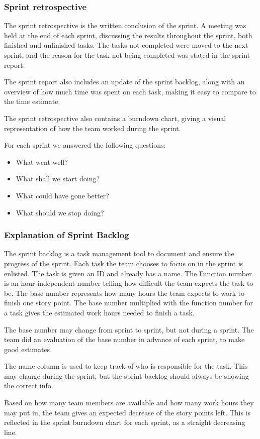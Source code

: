 \subsubsection{Sprint retrospective}
The sprint retrospective is the written conclusion of the sprint. A meeting was held at the end of each 
sprint, discussing the results throughout the sprint, both finished and unfinished tasks. The tasks not 
completed were moved to the next sprint, and the reason for the task not being completed was stated in 
the sprint report. 

The sprint report also includes an update of the sprint backlog, along with an overview of how much time 
was spent on each task, making it easy to compare to the time estimate. 

The sprint retrospective also contains a burndown chart, giving a visual representation of how the team 
worked during the sprint.

For each sprint we answered the following questions: 
\begin{itemize}
	\item What went well?
	\item What shall we start doing?
	\item What could have gone better?
	\item What should we stop doing?
\end{itemize}

\subsubsection{Explanation of Sprint Backlog}
The sprint backlog is a task management tool to document and ensure the progress of the sprint. Each task the 
team chooses to focus on in the sprint is enlisted. The task is given an ID and already has a name. The 
Function number is an hour-independent number telling how difficult the team expects the task to be. The 
base number represents how many hours the team expects to work to finish one story point. The base number multiplied 
with the function number for a task gives the estimated work hours needed to finish a task.

The base number may change from sprint to sprint, but not during a sprint. The team did an evaluation of 
the base number in advance of each sprint, to make good estimates.

The name column is used to keep track of who is responsible for the task. This may change during the sprint, 
but the sprint backlog should always be showing the correct info.

Based on how many team members are available and how many work hours they may put in, the team gives an 
expected decrease of the story points left. This is reflected in the sprint burndown chart for each sprint, 
as a straight decreasing line.